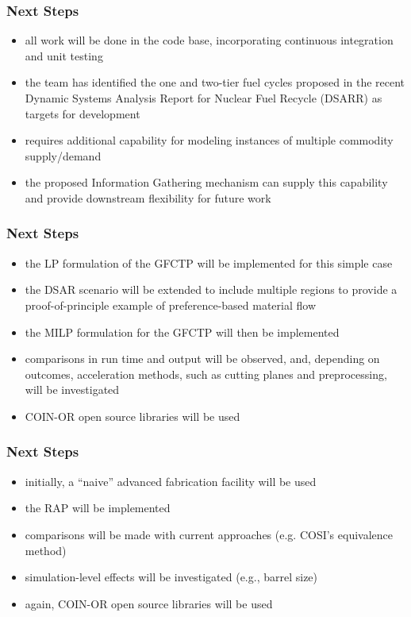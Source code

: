 \begin{frame}[ctb!]
  \frametitle{Next Steps} 
  
  \begin{itemize}
    \item all work will be done in the
      \href{github.com/cyclus/cyclus}{\Cyclus} code base, incorporating
      continuous integration and unit testing
    \item the \Cyclus team has identified the one and two-tier fuel cycles
      proposed in the recent Dynamic Systems Analysis Report for Nuclear Fuel
      Recycle (DSARR) \cite{dixon_dynamic_2008} as targets for
      development
    \item \Cyclus requires additional capability for modeling instances of
      multiple commodity supply/demand
    \item the proposed Information Gathering mechanism can supply this capability
      and provide downstream flexibility for future work
  \end{itemize}
\end{frame}

\begin{frame}[ctb!]
  \frametitle{Next Steps} 

  \begin{itemize}
    \item the LP formulation of the GFCTP will be implemented for this simple
      case
    \item the DSAR scenario will be extended to include multiple regions to
      provide a proof-of-principle example of preference-based material flow
    \item the MILP formulation for the GFCTP will then be implemented
    \item comparisons in run time and output will be observed, and, depending on
      outcomes, acceleration methods, such as cutting planes and preprocessing,
      will be investigated
    \item COIN-OR\cite{lougee_common_2003} open source libraries will be used
  \end{itemize}
\end{frame}

\begin{frame}[ctb!]
  \frametitle{Next Steps} 
  
  \begin{itemize}
    \item initially, a ``naive'' advanced fabrication facility will be used
    \item the RAP will be implemented 
    \item comparisons will be made with current approaches (e.g. COSI's equivalence method)
    \item simulation-level effects will be investigated (e.g., barrel size)
    \item again, COIN-OR open source libraries will be used
  \end{itemize}
\end{frame}
